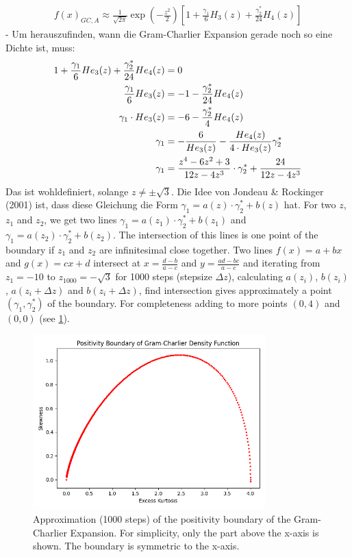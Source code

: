 \begin{align}
    \label{eq:gc_a_expansion_s_ek}
    f(x)_{GC,A} \approx \frac{1}{\sqrt{2\pi}}\exp\left(-\frac{z^2}{2}\right) \left[1 + \frac{\gamma_1}{6}H_3(z) + \frac{\gamma_2^*}{24}H_4(z)\right]
\end{align}
- Um herauszufinden, wann die Gram-Charlier Expansion gerade noch so eine Dichte ist, muss:
\begin{align}
    1 + \frac{\gamma_1}{6}He_3(z) + \frac{\gamma_2^*}{24}He_4(z) &= 0 \notag \\
    \frac{\gamma_1}{6}He_3(z) &= -1 - \frac{\gamma_2^*}{24}He_4(z) \notag \\
    \gamma_1\cdot He_3(z) &= -6 - \frac{\gamma_2^*}{4}He_4(z) \notag \\
    \gamma_1 &= -\frac{6}{He_3(z)} - \frac{He_4(z)}{4\cdot He_3(z)}\gamma_2^* \notag \\
    \gamma_1 &= \frac{z^4-6z^2+3}{12z-4z^3}\cdot \gamma_2^* + \frac{24}{12z-4z^3} \notag
\end{align}
Das ist wohldefiniert, solange $z\neq\pm\sqrt{3}$. Die Idee von Jondeau & Rockinger (2001) ist, dass diese Gleichung die Form $\gamma_1 = a(z)\cdot\gamma_2^* + b(z)$ hat. For two $z$, $z_1$ and $z_2$, we get two lines $\gamma_1 = a(z_1)\cdot \gamma_2^* + b(z_1)$ and $\gamma_1 = a(z_2)\cdot \gamma_2^* + b(z_2)$. The intersection of this lines is one point of the boundary if $z_1$ and $z_2$ are infinitesimal close together. Two lines $f(x) = a+bx$ and $g(x) = cx+d$ intersect at $x = \frac{d-b}{a-c}$ and $y = \frac{ad-bc}{a-c}$ and iterating from $z_1=-10$ to $z_{1000}=-\sqrt{3}$ for 1000 steps (stepsize $\Delta z$), calculating $a(z_i)$, $b(z_i)$, $a(z_i+\Delta z)$ and $b(z_i+\Delta z)$, find intersection gives approximately a point $(\gamma_1, \gamma_2^*)$ of the boundary. For completeness adding to more points $(0,4)$ and $(0,0)$ (see \ref{fig:gram_charlier_boundary}).


\begin{figure}[h]
    \centering
    \includegraphics[width=0.8\textwidth]{img/gc_positivity_boundary.png}
    \caption{Approximation (1000 steps) of the positivity boundary of the Gram-Charlier Expansion. For simplicity, only the part above the x-axis is shown. The boundary is symmetric to the x-axis.}
    \label{fig:gram_charlier_boundary}
\end{figure}

